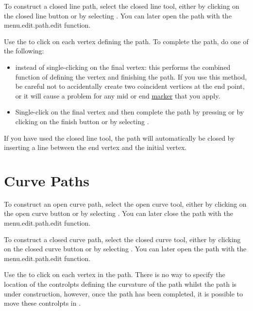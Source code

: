 To construct a closed line \gls{path}, select the closed line tool,
either by clicking on the closed line button or by selecting
. You can later open the \gls{path}
with the \gls{menu.edit.path.edit} function.

Use the  to click on each vertex
defining the path. To complete the \gls{path}, do one of the following:
\begin{itemize}
\item {} instead of single-clicking
on the final vertex: this performs the combined function of defining
the vertex and finishing the path. If you use this method, be
careful not to accidentally create two coincident vertices at the
end point, or it will cause a problem for any mid or end
\hyperref[sec:markers]{marker} that you apply.

\item Single-\gls{click} on the final vertex and then
complete the path by pressing  or by
clicking on the finish button or by selecting
.
\end{itemize}
If you have used the closed line tool, the path will automatically
be closed by inserting a line between the end vertex
and the initial vertex.


\section{Curve Paths}\label{sec:newcurvepath}


To construct an open curve \gls{path}, select the open curve tool,
either by clicking on the open curve button or by selecting
. You can later close the \gls{path}
with the \gls{menu.edit.path.edit} function.


To construct a closed curve \gls{path}, select the closed curve tool,
either by clicking on the closed curve button or by selecting
. You can later open the \gls{path}
with the \gls{menu.edit.path.edit} function.

Use the  to click on each vertex in
the \gls*{path}.  There is no way to specify the location of the
\glspl{controlpt} defining the curvature of the \gls*{path} whilst the
\gls*{path} is under construction, however, once the
\gls*{path} has been completed, it is possible to move these
\glspl*{controlpt} in \editpathmode.

